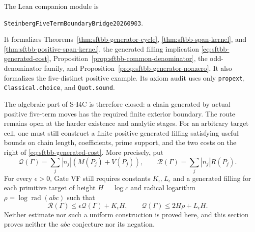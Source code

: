 The Lean companion module is
\begin{center}
\texttt{SteinbergFiveTermBoundaryBridge20260903}.
\end{center}
It formalizes Theorems~\ref{thm:sftbb-generator-cycle},
\ref{thm:sftbb-span-kernel}, and
\ref{thm:sftbb-positive-span-kernel}, the generated filling implication
\eqref{eq:sftbb-generated-cost},
Proposition~\ref{prop:sftbb-common-denominator}, the odd-denominator family,
and Proposition~\ref{prop:sftbb-generator-nonzero}.  It also formalizes the
five-distinct positive example.  Its axiom audit uses only
\texttt{propext}, \texttt{Classical.choice}, and \texttt{Quot.sound}.

The algebraic part of S-I4C is therefore closed: a chain generated by actual
positive five-term moves has the required finite exterior boundary.  The
route remains open at the harder existence and analytic stages.  For an
arbitrary target cell, one must still construct a finite positive generated
filling satisfying useful bounds on chain length, coefficients, prime
support, and the two costs on the right of
\eqref{eq:sftbb-generated-cost}.  More precisely, put
\[
 \mathcal Q(\Gamma)=\sum_j|n_j|(M(P_j)+V(P_j)),
 \qquad
 \mathcal R(\Gamma)=\sum_j|n_j|R(P_j).
\]
For every $\epsilon>0$, Gate VF still requires constants
$K_\epsilon,L_\epsilon$ and a generated filling for each primitive target
of height $H=\log c$ and radical logarithm
$\rho=\log\operatorname{rad}(abc)$ such that
\[
 \mathcal R(\Gamma)\leq\epsilon\mathcal Q(\Gamma)+K_\epsilon H,
 \qquad
 \mathcal Q(\Gamma)\leq2H\rho+L_\epsilon H.
\]
Neither estimate nor such a uniform construction is proved here, and this
section proves neither the $abc$ conjecture nor its negation.
